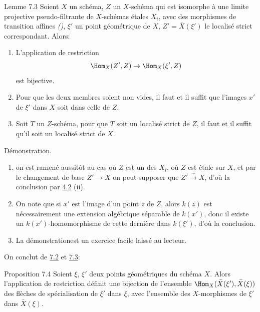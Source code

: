 \documentclass[10pt]{../fichiers-configuration-latex/smfart}
\begin{document}
\begin{enonce*}{Lemme 7.3}
Soient $X$ un schéma, $Z$ un $X$-schéma qui est isomorphe à une
limite projective pseudo-filtrante de $X$-schémas étales $X_{i}$,
avec des morphismes de transition affines
\emph{()}, $\xi'$ un point géométrique de $X$,
$Z' = \bar{X} (\xi')$ le localisé strict correspondant. Alors:
\begin{enumerate}
\renewcommand{\theenumi}{\alph{enumi}}
\renewcommand{\labelenumi}{\theenumi)}
\item L'application de restriction
$$
\Hom_X (Z', Z) \to \Hom_X(\xi', Z)
$$
est bijective.

\item Pour que les deux membres soient non vides, il faut et il suffit
  que l'images $x'$ de $\xi'$ dans $X$ soit dans celle de $Z$.

\item Soit $T$ un $Z$-schéma, pour que $T$ soit un localisé strict de
  $Z$, il faut et il suffit qu'il soit un localisé strict de $X$.
\end{enumerate}
\end{enonce*}

Démonstration.
\begin{enumerate}
\renewcommand{\theenumi}{\alph{enumi}}
\renewcommand{\labelenumi}{\theenumi)}
\item on est ramené aussitôt au cas où $Z$ est un des $X_i$, \ie où
  $Z$ est étale sur $X$, et par le changement de base $Z'\to X$ on
  peut supposer que $Z'\xrightarrow{\sim} X$, d'où la conclusion par
  \hyperref[VIII.def4.2]{4.2} (ii).

\item On note que si $x'$ est l'image d'un point $z$ de $Z$, alors
  $k(z)$ est nécessairement une extension algébrique séparable de
  $k(x')$, donc il existe un $k(x')$-homomorphisme de cette dernière
  dans $k(\xi')$, d'où la conclusion.

\item La démonstration\pageoriginale est un exercice facile
  laissé au lecteur.
\end{enumerate}

On conclut de \hyperref[VIII.def7.2]{7.2} et \hyperref[VIII.lem7.3]{7.3}:

\begin{enonce*}{Proposition 7.4}
Soient $\xi$, $\xi'$ deux points géométriques du schéma $X$. Alors
l'application de restriction définit une bijection de l'ensemble
$\Hom_{X} (\bar{X}(\xi'), \bar{X}(\xi))$ des flèches de spécialisation
de $\xi'$ dans $\xi$, avec l'ensemble des $X$-morphismes de $\xi'$
dans $\bar{X}(\xi)$.
\end{enonce*}
\end{document}
